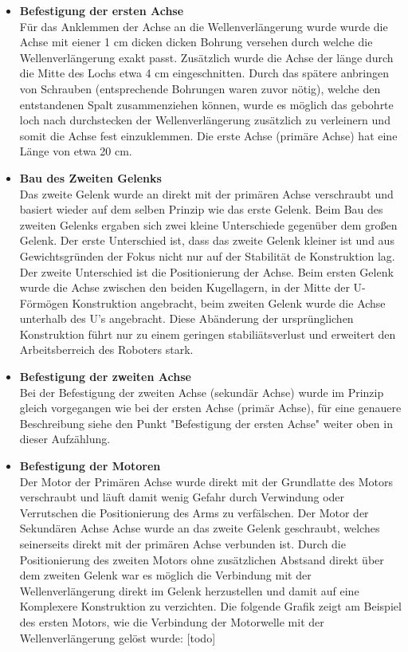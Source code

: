 \begin{itemize}
\item \textbf{Befestigung der ersten Achse}\\
Für das Anklemmen der Achse an die Wellenverlängerung wurde wurde die Achse mit eiener 1 cm dicken dicken Bohrung versehen durch welche die Wellenverlängerung exakt passt. Zusätzlich wurde die Achse der länge durch die Mitte des Lochs etwa 4 cm eingeschnitten. Durch das spätere anbringen von Schrauben (entsprechende Bohrungen waren zuvor nötig), welche den entstandenen Spalt zusammenziehen können, wurde es möglich das gebohrte loch nach durchstecken der Wellenverlängerung zusätzlich zu verleinern und somit die Achse fest einzuklemmen.
Die erste Achse (primäre Achse) hat eine Länge von etwa 20 cm.
\item \textbf{Bau des Zweiten Gelenks}\\
Das zweite Gelenk wurde an direkt mit der primären Achse verschraubt und basiert wieder auf dem selben Prinzip wie das erste Gelenk. Beim Bau des zweiten Gelenks ergaben sich zwei kleine Unterschiede gegenüber dem großen Gelenk. Der erste Unterschied ist, dass das zweite Gelenk kleiner ist und aus Gewichtsgründen der Fokus nicht nur auf der Stabilität de Konstruktion lag. 
Der zweite Unterschied ist die Positionierung der Achse. Beim ersten Gelenk wurde die Achse zwischen den beiden Kugellagern, in der Mitte der U-Förmögen Konstruktion angebracht, beim zweiten Gelenk wurde die Achse unterhalb des U's angebracht. Diese Abänderung der ursprünglichen Konstruktion führt nur zu einem geringen stabiliätsverlust und erweitert den Arbeitsberreich des Roboters stark.
\item \textbf{Befestigung der zweiten Achse}\\
Bei der Befestigung der zweiten Achse (sekundär Achse) wurde im Prinzip gleich vorgegangen wie bei der ersten Achse (primär Achse), für eine genauere Beschreibung siehe den Punkt "Befestigung der ersten Achse" weiter oben in dieser Aufzählung.
\item \textbf{Befestigung der Motoren}\\
Der Motor der Primären Achse wurde direkt mit der Grundlatte des Motors verschraubt und läuft damit wenig Gefahr durch Verwindung oder Verrutschen die Positionierung des Arms zu verfälschen.
Der Motor der Sekundären Achse Achse wurde an das zweite Gelenk geschraubt, welches seinerseits direkt mit der primären Achse verbunden ist. Durch die Positionierung des zweiten Motors ohne zusätzlichen Abstsand direkt über dem zweiten Gelenk war es möglich die Verbindung mit der Wellenverlängerung direkt im Gelenk herzustellen und damit auf eine Komplexere Konstruktion zu verzichten. Die folgende Grafik zeigt am Beispiel des ersten Motors, wie die Verbindung der Motorwelle mit der Wellenverlängerung gelöst wurde: [todo]
\end{itemize}
